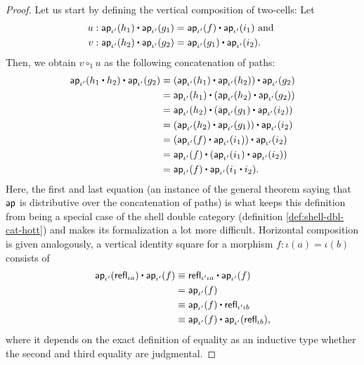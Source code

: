 \begin{proof}
Let us start by defining the vertical composition of two-cells:
Let 
\begin{align*}
u &: \apiop(h_1) \ct \apiop(g_1) = \apiop(f) \ct \apiop(i_1) \text{ and } \\
v &: \apiop(h_2) \ct \apiop(g_2) = \apiop(g_1) \ct \apiop(i_2) \text{.}
\end{align*}
Then, we obtain $v \circ_1 u$ as the following concatenation of paths:
\begin{equation}
\begin{aligned}
\apiop (h_1 \ct h_2) \ct \apiop(g_2) &= (\apiop(h_1) \ct \apiop(h_2)) \ct \apiop(g_2) \\
	&= \apiop(h_1) \ct (\apiop(h_2) \ct \apiop(g_2)) \\
	&= \apiop(h_2) \ct (\apiop(g_1) \ct \apiop(i_2)) \\
	&= (\apiop(h_2) \ct \apiop(g_1)) \ct \apiop(i_2) \\
	&= (\apiop(f) \ct \apiop(i_1)) \ct \apiop(i_2) \\
	&= \apiop(f) \ct (\apiop(i_1) \ct \apiop(i_2)) \\
	&= \apiop(f) \ct \apiop(i_1 \ct i_2) \text{.}
\end{aligned}
\end{equation}
Here, the first and last equation (an instance of the general theorem saying that $\mathsf{ap}$
is distributive over the concatenation of paths) is what keeps this definition from
being a special case of the shell double category (definition \ref{def:shell-dbl-cat-hott})
and makes its formalization a lot more difficult. Horizontal composition is given
analogously, a vertical identity square for a morphism $f : \iota(a) = \iota(b)$
consists of
\begin{align*}
\apiop(\refl_{\iota a}) \ct \apiop(f) &\equiv \refl_{\iota' \iota a} \ct \apiop(f) \\
	&= \apiop(f) \\
	&\equiv \apiop(f) \ct \refl_{\iota' \iota b} \\
	&\equiv \apiop(f) \ct \apiop(\refl_{\iota b}) \text{,}
\end{align*}
where it depends on the exact definition of equality as an inductive type whether
the second and third equality are judgmental.


\end{proof}

